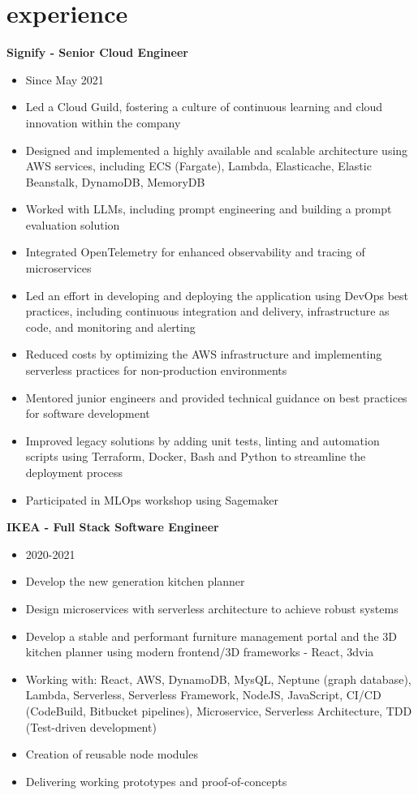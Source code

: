 \documentclass[]{friggeri-cv}
\begin{document}
\section{experience}

\textbf{Signify - Senior Cloud Engineer}
\begin{itemize}
  \item Since May 2021
  \item Led a Cloud Guild, fostering a culture of continuous learning and cloud innovation within the company
  \item Designed and implemented a highly available and scalable architecture using AWS services, including ECS (Fargate), Lambda, Elasticache, Elastic Beanstalk, DynamoDB, MemoryDB
  \item Worked with LLMs, including prompt engineering and building a prompt evaluation solution
  \item Integrated OpenTelemetry for enhanced observability and tracing of microservices
  \item Led an effort in developing and deploying the application using DevOps best practices, including continuous integration and delivery, infrastructure as code, and monitoring and alerting
  \item Reduced costs by optimizing the AWS infrastructure and implementing serverless practices for non-production environments
  \item Mentored junior engineers and provided technical guidance on best practices for software development
  \item Improved legacy solutions by adding unit tests, linting and automation scripts using Terraform, Docker, Bash and Python to streamline the deployment process
  \item Participated in MLOps workshop using Sagemaker
\end{itemize}

\textbf{IKEA - Full Stack Software Engineer}
\begin{itemize}
  \item 2020-2021
  \item Develop the new generation kitchen planner
  \item Design microservices with serverless architecture to achieve robust systems
  \item Develop a stable and performant furniture management portal and the 3D kitchen planner using modern frontend/3D frameworks - React, 3dvia
  \item Working with: React, AWS, DynamoDB, MysQL, Neptune (graph database), Lambda, Serverless, Serverless Framework, NodeJS, JavaScript, CI/CD (CodeBuild, Bitbucket pipelines), Microservice, Serverless Architecture, TDD (Test-driven development)
  \item Creation of reusable node modules
  \item Delivering working prototypes and proof-of-concepts
\end{itemize}
\end{document}

